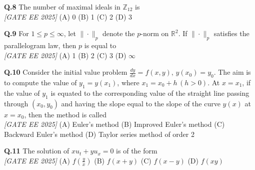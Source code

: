 \documentclass[11pt]{article}
\begin{document}
\begin{flushleft}

\textbf{Q.8} The number of maximal ideals in $\mathbb{Z}_{12}$ is
\\[1ex] \textit{[GATE EE 2025]}
\newline
(A) 0 \hspace{1cm} (B) 1 \hspace{1cm} (C) 2 \hspace{1cm} (D) 3
\newline

\newline

\textbf{Q.9} For $1 \leq p \leq \infty$, let $\| \cdot \|_p$ denote the $p$-norm on $\mathbb{R}^2$. If $\| \cdot \|_p$ satisfies the parallelogram law, then $p$ is equal to
\\[1ex] \textit{[GATE EE 2025]}
\newline
(A) 1 \hspace{1cm} (B) 2 \hspace{1cm} (C) 3 \hspace{1cm} (D) $\infty$
\newline
\newline

\textbf{Q.10} Consider the initial value problem $\frac{dy}{dx} = f(x, y), \, y(x_0) = y_0$. The aim is to compute the value of $y_1 = y(x_1)$, where $x_1 = x_0 + h \, (h > 0)$. At $x = x_1$, if the value of $y_1$ is equated to the corresponding value of the straight line passing through $(x_0, y_0)$ and having the slope equal to the slope of the curve $y(x)$ at $x = x_0$, then the method is called
\\[1ex] \textit{[GATE EE 2025]}
\newline
(A) Euler's method \hspace{0.5cm} (B) Improved Euler's method \hspace{0.5cm} (C) Backward Euler's method \hspace{0.5cm} (D) Taylor series method of order 2

\newline
\newline

\textbf{Q.11} The solution of $xu_t + yu_x = 0$ is of the form
\\[1ex] \textit{[GATE EE 2025]}
\newline
(A) $f\left(\frac{y}{x}\right)$ \hspace{1cm} (B) $f(x+y)$ \hspace{1cm} (C) $f(x - y)$ \hspace{1cm} (D) $f(xy)$


\end{flushleft}
\end{document}
